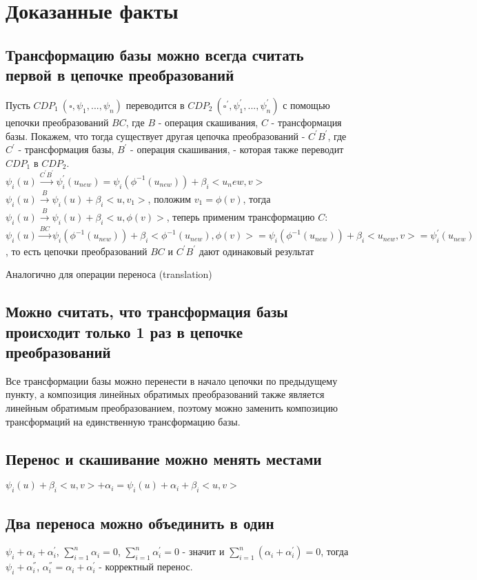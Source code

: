 \documentclass[16pt]{article}
\theoremstyle{definition}
\begin{document}
\section{Доказанные факты}
\subsection{Трансформацию базы можно всегда считать первой в цепочке преобразований}
Пусть $CDP_1\ (\square, \psi_1, ..., \psi_n)$ переводится в $CDP_2\ (\square^{'}, \psi_1^{'}, ..., \psi_n^{'})$ с помощью цепочки преобразований $BC$, где $B$ - операция скашивания, $C$ - трансформация базы. Покажем, что тогда существует другая цепочка преобразований - $C^{'}B^{'}$, где  $C^{'}$ - трансформация базы, $B^{'}$ - операция скашивания, - которая также переводит $CDP_1$ в $CDP_2$.
\\
$\psi_i(u) \xrightarrow[]{C^{'}B^{'}} \psi_i^{'}(u_{new}) = \psi_i(\phi^{-1}(u_{new})) + \beta_i<u_new, v>$
\\
$\psi_i(u) \xrightarrow[]{B} \psi_i(u) + \beta_i<u, v_1>$, положим $v_1 = \phi(v)$, тогда $\psi_i(u) \xrightarrow[]{B} \psi_i(u) + \beta_i<u, \phi(v)>$, теперь применим трансформацию $C$: 
$\psi_i(u) \xrightarrow[]{BC} \psi_i(\phi^{-1}(u_{new})) + \beta_i<\phi^{-1}(u_{new}), \phi(v)> = \psi_i(\phi^{-1}(u_{new})) + \beta_i<u_{new}, v> = \psi_i^{'}(u_{new})$, то есть цепочки преобразований $BC$ и $C^{'}B^{'}$ дают одинаковый результат

Аналогично для операции переноса (translation)

\subsection{Можно считать, что трансформация базы происходит только 1 раз в цепочке преобразований}
Все трансформации базы можно перенести в начало цепочки по предыдущему пункту, а композиция линейных обратимых преобразований также является линейным обратимым преобразованием, поэтому можно заменить композицию трансформаций на единственную трансформацию базы.

\subsection{Перенос и скашивание можно менять местами}
$\psi_i(u) + \beta_i<u, v> + \alpha_i = \psi_i(u) + \alpha_i + \beta_i<u, v>$

\subsection{Два переноса можно объединить в один}
$\psi_i + \alpha_i + \alpha^{'}_i$, $\sum_{i=1}^n\alpha_i = 0$, $\sum_{i=1}^n\alpha^{'}_i = 0$ - значит и $\sum_{i=1}^n(\alpha_i + \alpha^{'}_i) = 0$, тогда $\psi_i + \alpha^{''}_i$, $\alpha^{''}_i = \alpha_i + \alpha^{'}_i$ - корректный перенос.
\end{document}

